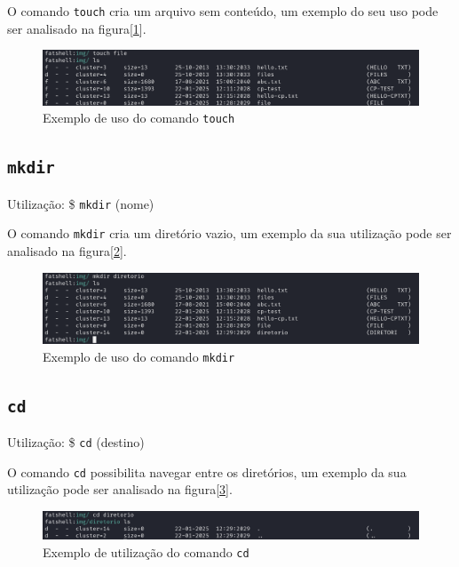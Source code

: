 \documentclass[
    12pt,				%
    oneside,   	        %
    a4paper,			%
    english,			%
    french,				%
    spanish,			%
    brazil,				%
    ]{pacotes/abntex2}
\begin{document}
O comando \texttt{touch} cria um arquivo sem conteúdo, um exemplo do seu uso pode ser analisado na figura[\ref{fig:touch}].

\begin{figure}[h!]
    \centering
    \includegraphics[width=450pt]{figuras/resultados/8-touch.PNG}
    \caption{Exemplo de uso do comando \texttt{touch}}
    \label{fig:touch}
\end{figure}


\subsection{\texttt{mkdir}}
\label{subsec:mkdir}
Utilização: \$ \texttt{mkdir} (nome)

O comando \texttt{mkdir} cria um diretório vazio, um exemplo da sua utilização pode ser analisado na figura[\ref{fig:mkdir}].

\begin{figure}[H]
    \centering
    \includegraphics[width=450pt]{figuras/resultados/9-mkdir.PNG}
    \caption{Exemplo de uso do comando \texttt{mkdir}}
    \label{fig:mkdir}
\end{figure}


\subsection{\texttt{cd}}
\label{subsec:cd}
Utilização: \$ \texttt{cd} (destino)

O comando \texttt{cd} possibilita navegar entre os diretórios, um exemplo da sua utilização pode ser analisado na figura[\ref{fig:cd}].

\begin{figure}[H]
    \centering
    \includegraphics[width=450pt]{figuras/resultados/10-cd.PNG}
    \caption{Exemplo de utilização do comando \texttt{cd}}
    \label{fig:cd}
\end{figure}
\end{document}
